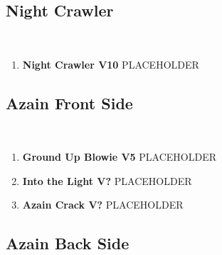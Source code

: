 \subsection*{Night Crawler}\label{bf:Night Crawler}
\

\begin{enumerate}[resume]
	\item\label{rt:Night Crawler} \colorbox{Goldenrod!50}{\textbf{Night Crawler V10  } }
	\newline PLACEHOLDER\
\end{enumerate}
\subsection*{Azain Front Side}\label{bf:Azain Front Side}
\

\begin{enumerate}[resume]
	\item\label{rt:Ground Up Blowie} \colorbox{RoyalBlue!20}{\textbf{Ground Up Blowie V5     } }
	\newline PLACEHOLDER\
	\item\label{rt:Into the Light} \colorbox{black!20}{\textbf{Into the Light V?  } }
	\newline PLACEHOLDER\
	\item\label{rt:Azain Crack} \colorbox{black!20}{\textbf{Azain Crack V?  } }
	\newline PLACEHOLDER\
\end{enumerate}
\subsection*{Azain Back Side}\label{bf:Azain Back Side}
\

